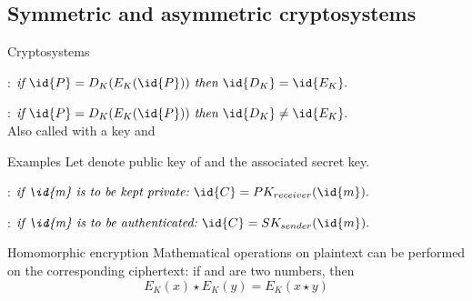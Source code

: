 \subsection{Symmetric and asymmetric cryptosystems}
\begin{slide}{Cryptosystems}
  \begin{description}[Asymmetric]
  \item[\red{Symmetric}]:
    \(
    \mbox{\itshape if\ } \id{P} = D_K(E_K(\id{P})) \mbox{\itshape \ then\ } \id{D_K} = \id{E_K}.
    \)
  \item[\red{Asymmetric}]:
    \(
    \mbox{\itshape if\ } \id{P} = D_{K}(E_{K}(\id{P})) \mbox{\itshape \ then\ } \id{D_{K}} \neq \id{E_{K}}.
    \) \\
    Also called  with a  key  and  
  \end{description}
  
  \begin{exampleblock}{Examples}
    Let  denote public key of  and  the associated secret key.
    \begin{description}
    \item[\red{Confidential message}]:
      \(
      \mbox{\itshape if \id{m} is to be kept private:\ }\id{C} = PK_{receiver}(\id{m}).
      \)
    \item[\red{Authenticated message}]:
      \(
      \mbox{\itshape if \id{m} is to be authenticated:\ }\id{C} = SK_{sender}(\id{m}).
      \)
    \end{description}
  \end{exampleblock}

  \begin{block}{Homomorphic encryption}
    Mathematical operations on plaintext can be performed on the corresponding ciphertext: if
     and  are two numbers, then
    \[
    E_{K}(x) \star E_{K}(y) = E_{K}( x \star y )
    \]  
  \end{block}
\end{slide}
